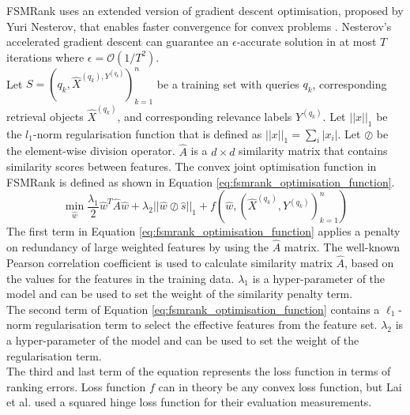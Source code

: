 FSMRank uses an extended version of gradient descent optimisation, proposed by Yuri Nesterov, that enables faster convergence for convex problems \cite{Nesterov2004}. Nesterov's accelerated gradient descent can guarantee an $\epsilon$-accurate solution in at most $T$ iterations where $\epsilon=\mathcal{O}(1/T^2)$.\\

Let $S = {(q_k, \hat{X}^{(q_k), Y^{(q_k)}})}_{k=1}^n$ be a training set with queries $q_k$, corresponding retrieval objects $\hat{X}^{(q_k)}$, and corresponding relevance labels $Y^{(q_k)}$. Let $||x||_1$ be the $l_1$-norm regularisation function that is defined as $||x||_1 = \sum\nolimits_i |x_i|$. Let $\oslash$ be the element-wise division operator. $\hat{A}$ is a $d \times d$ similarity matrix that contains similarity scores between features. The convex joint optimisation function in FSMRank is defined as shown in Equation \ref{eq:fsmrank_optimisation_function}.
\begin{equation}
\min_{\hat{w}} \frac{\lambda_1}{2} \hat{w}^T \hat{A}\hat{w} + \lambda_2 ||\hat{w}\oslash\hat{s}||_1 + f(\hat{w}, (\hat{X}^{(q_k)}, Y^{(q_k)})_{k=1}^n)
\label{eq:fsmrank_optimisation_function}
\end{equation}
\noindent The first term in Equation \ref{eq:fsmrank_optimisation_function} applies a penalty on redundancy of large weighted features by using the $\hat{A}$ matrix. The well-known Pearson correlation coefficient is used to calculate similarity matrix $\hat{A}$, based on the values for the features in the training data. $\lambda_1$ is a hyper-parameter of the model and can be used to set the weight of the similarity penalty term.\\

The second term of Equation \ref{eq:fsmrank_optimisation_function} contains a $\ell_1$-norm regularisation term to select the effective features from the feature set. $\lambda_2$ is a hyper-parameter of the model and can be used to set the weight of the regularisation term.\\

The third and last term of the equation represents the loss function in terms of ranking errors. Loss function $f$ can in theory be any convex loss function, but Lai et al. \cite{Lai2013c} used a squared hinge loss function for their evaluation measurements.\\

